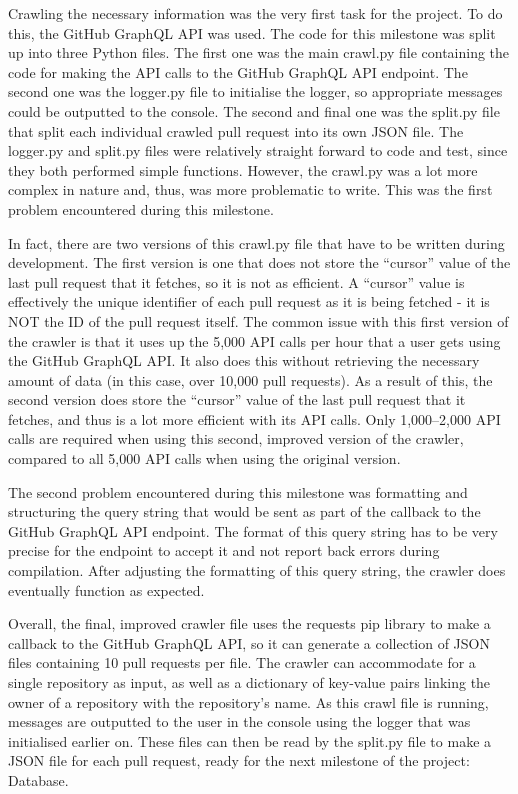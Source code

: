 Crawling the necessary information was the very first task for the project.
To do this, the GitHub GraphQL API was used.
The code for this milestone was split up into three Python files.
The first one was the main crawl.py file
containing the code for making the API calls to the GitHub GraphQL API endpoint.
The second one was the logger.py file to initialise the logger,
so appropriate messages could be outputted to the console.
The second and final one was the split.py file that split each individual crawled pull request into its own JSON file.
The logger.py and split.py files were relatively straight forward to code and test,
since they both performed simple functions.
However, the crawl.py was a lot more complex in nature and, thus, was more problematic to write.
This was the first problem encountered during this milestone.

In fact, there are two versions of this crawl.py file that have to be written during development.
The first version is one that does not store the ``cursor'' value of the last pull request that it fetches,
so it is not as efficient.
A ``cursor'' value is effectively the unique identifier of each pull request as it is being fetched -
it is NOT the ID of the pull request itself.
The common issue with this first version of the crawler is
that it uses up the 5,000 API calls per hour that a user gets using the GitHub GraphQL API\@.
It also does this without retrieving the necessary amount of data (in this case, over 10,000 pull requests).
As a result of this, the second version does store the ``cursor'' value of the last pull request that it fetches,
and thus is a lot more efficient with its API calls.
Only 1,000--2,000 API calls are required when using this second, improved version of the crawler,
compared to all 5,000 API calls when using the original version.

The second problem encountered during this milestone was formatting
and structuring the query string that would be sent as part of the callback to the GitHub GraphQL API endpoint.
The format of this query string has
to be very precise for the endpoint to accept it and not report back errors during compilation.
After adjusting the formatting of this query string, the crawler does eventually function as expected.

Overall, the final, improved crawler file uses the requests pip library to make a callback to the GitHub GraphQL API, so it can generate a collection of JSON files containing 10 pull requests per file.
The crawler can accommodate for a single repository as input,
as well as a dictionary of key-value pairs linking the owner of a repository with the repository's name.
As this crawl file is running,
messages are outputted to the user in the console using the logger that was initialised earlier on.
These files can then be read by the split.py file to make a JSON file for each pull request,
ready for the next milestone of the project: Database.